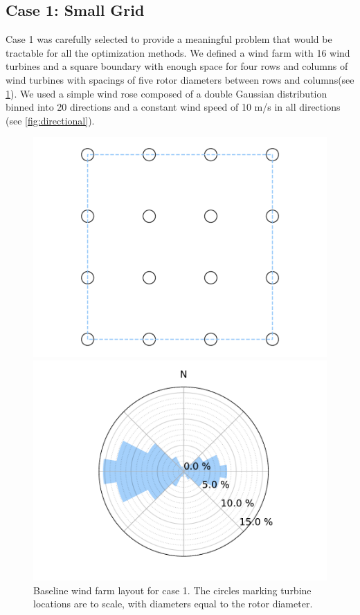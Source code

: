 \documentclass[a4paper]{jpconf}
\begin{document}
\subsection{Case 1: Small Grid}
Case 1 was carefully selected to provide a meaningful problem that would be tractable for all the optimization methods. We defined a wind farm with 16 wind turbines and a square boundary with enough space for four rows and columns of wind turbines with spacings of five rotor diameters between rows and columns(see \cref{fig:grid_case}). We used a simple wind rose composed of a double Gaussian distribution binned into 20 directions and a constant wind speed of 10 m/s in all directions (see \cref{fig:directional}).
\begin{figure}[h!]
\centering
\begin{minipage}[t]{18pc}
\centering
\includegraphics[width=1.\textwidth, trim={1.5cm, 0cm, 1.5cm, 0cm}, clip]{final_images/layouts/16_turb_start.pdf}
\caption{Baseline wind farm layout for case 1. The circles marking turbine locations are to scale, with diameters equal to the rotor diameter.}
\label{fig:grid_case}
\end{minipage}\hspace{1pc}%
\begin{minipage}[t]{18pc}
\centering
\includegraphics[width=\textwidth, trim={2.0cm 0cm 2.0cm 0cm}, clip]{final_images/windroses/freqwindrose_20_dir.pdf}

\end{minipage}
\end{figure}
\end{document}
